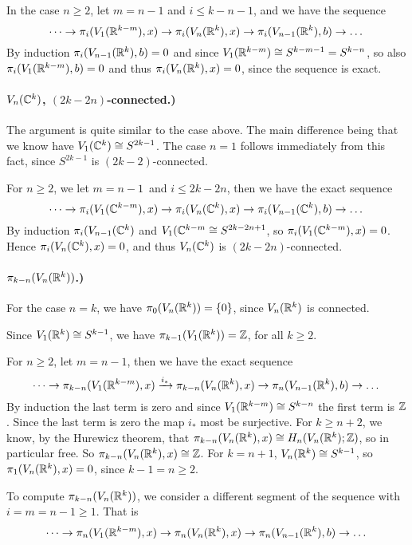 \documentclass[a4paper,11pt,english]{article}
\begin{document}
\begin{exercise}[1]
In the case $n \ge 2$, let $m = n-1$ and $i \le k-n-1$, and we have the sequence 
\[ \dots \to \pi_i(V_1(\mathbb{R}^{k-m}), x) \to \pi_i(V_n(\mathbb{R}^k), x) \to  \pi_i(V_{n-1}(\mathbb{R}^k),
b) \to \dots \]
By induction $\pi_i(V_{n-1}(\mathbb{R}^k), b) = 0$ and since $V_1(\mathbb{R}^{k-m}) \cong
S^{k-m-1} = S^{k-n}$, so also $\pi_i(V_1(\mathbb{R}^{k-m}), b) = 0$ and thus
$\pi_i(V_n(\mathbb{R}^k), x) = 0$, since the sequence is exact.


\paragraph{$V_n(\mathbb{C}^k)$, $(2k-2n)$-connected.)}
The argument is quite similar to the case above. The main difference being that
we know have $V_1(\mathbb{C}^k) \cong S^{2k-1}$. The case $n=1$ follows immediately from
this fact, since $S^{2k-1}$ is $(2k-2)$-connected.

For $n\ge 2$, we let $m=n-1$ and $i\le 2k-2n$, then we have the exact sequence
\[ \dots \to \pi_i(V_1(\mathbb{C}^{k-m}), x) \to \pi_i(V_n(\mathbb{C}^k), x) \to  \pi_i(V_{n-1}(\mathbb{C}^k),
b) \to \dots \]
By induction $\pi_i(V_{n-1}(\mathbb{C}^k)$ and $V_1(\mathbb{C}^{k-m} \cong S^{2k-2n+1}$, so
$\pi_i(V_1(\mathbb{C}^{k-m}), x) = 0$. Hence $\pi_i(V_n(\mathbb{C}^k), x) = 0$, and thus
$V_n(\mathbb{C}^k)$ is $(2k-2n)$-connected.


\paragraph{$\pi_{k-n}(V_n(\mathbb{R}^k))$.)}
For the case $n = k$, we have $\pi_0(V_n(\mathbb{R}^{k})) = \{0\}$, since $V_n(\mathbb{R}^{k})$
is connected.


Since $V_1(\mathbb{R}^{k}) \cong S^{k-1}$, we have $\pi_{k-1}(V_1(\mathbb{R}^{k})) = \mathbb{Z}$, for
all $k \ge 2$. 

For $n \ge 2$, let $m = n-1$, then we have the exact sequence 
\[ \dots \to \pi_{k-n}(V_1(\mathbb{R}^{k-m}), x) \xrightarrow{i_*} \pi_{k-n}(V_n(\mathbb{R}^k), x) \to
\pi_n(V_{n-1}(\mathbb{R}^k),b) \to \dots \]
By induction the last term is zero and since $V_1(\mathbb{R}^{k-m}) \cong S^{k-n}$ the
first term is $\mathbb{Z}$. Since the last term is zero the map $i_*$ most be
surjective. For $k \ge n+2$, we know, by the Hurewicz theorem, that
$\pi_{k-n}(V_n(\mathbb{R}^k), x) \cong H_n(V_n(\mathbb{R}^k); \mathbb{Z})$, so in particular free. So
$\pi_{k-n}(V_n(\mathbb{R}^k), x) \cong \mathbb{Z}$. For $k = n+1$, $V_n(\mathbb{R}^k) \cong S^{k-1}$, so 
$\pi_1(V_n(\mathbb{R}^k), x) = 0$, since $k-1 = n \ge 2$.




To compute $\pi_{k-n}(V_n(\mathbb{R}^k))$, we consider a different segment of the
sequence with $i = m = n-1 \ge 1$. That is 
\[ \dots \to \pi_n(V_1(\mathbb{R}^{k-m}), x) \to \pi_n(V_n(\mathbb{R}^k), x) \to  \pi_n(V_{n-1}(\mathbb{R}^k),
b) \to \dots \]



\end{exercise}
\end{document}
